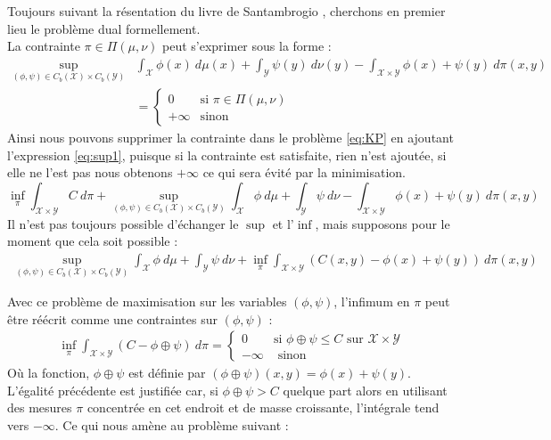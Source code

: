 \documentclass[a4paper,12pt]{article}
\begin{document}
Toujours suivant la résentation du livre de Santambrogio \cite{santambrogio2015optimal}, cherchons en premier lieu le problème dual formellement. \\
La contrainte $\pi\in\Pi(\mu,\nu)$ peut s'exprimer sous la forme : 
\begin{align}
\sup_{(\phi,\psi)\in C_b(\mathcal{X})\times C_b(\mathcal{Y})}& \int_{\mathcal{X}} \phi(x)\ d\mu (x) + \int_{\mathcal{Y}}\psi(y)\  d\nu(y) - \int_{\mathcal{X}\times\mathcal{Y}}\phi(x)+\psi(y)\ d\pi(x,y)\label{eq:sup1}\\
&= \left\{\begin{array}{cl}
0 & \text{si } \pi \in\Pi(\mu,\nu)\\
+\infty & \text{sinon}
\end{array}\right.\nonumber
\end{align}
Ainsi nous pouvons supprimer la contrainte dans le problème \eqref{eq:KP} en ajoutant l'expression \eqref{eq:sup1}, puisque si la contrainte est satisfaite, rien n'est ajoutée, si elle ne l'est pas nous obtenons $+\infty$ ce qui sera évité par la minimisation. 
$$
\inf_{\pi} \int_{\mathcal{X}\times\mathcal{Y}} C\ d\pi + \sup_{(\phi,\psi)\in C_b(\mathcal{X})\times C_b(\mathcal{Y})} \int_{\mathcal{X}} \phi\ d\mu + \int_{\mathcal{Y}}\psi\  d\nu - \int_{\mathcal{X}\times\mathcal{Y}}\phi(x)+\psi(y)\ d\pi(x,y)
$$
Il n'est pas toujours possible d'échanger le $\sup$ et l'$\inf$, mais supposons pour le moment que cela soit possible : 
\begin{align}
\sup_{(\phi,\psi)\in C_b(\mathcal{X})\times C_b(\mathcal{Y})} \int_{\mathcal{X}} \phi\ d\mu + \int_{\mathcal{Y}}\psi\  d\nu + \inf_{\pi} \int_{\mathcal{X}\times\mathcal{Y}}(C(x,y) - \phi(x)+\psi(y))\ d\pi(x,y)
\label{eq:infsupexchange}
\end{align}

Avec ce problème de maximisation sur les variables $(\phi,\psi)$, l'infimum en $\pi$ peut être réécrit comme une contraintes sur $(\phi,\psi)$ : 
\begin{align}
\inf_{\pi} \int_{\mathcal{X}\times\mathcal{Y}}(C - \phi\oplus\psi) \ d\pi = 
\left\{
\begin{array}{cl}
0 & \text{si } \phi\oplus\psi\leq C \text{ sur } \mathcal{X}\times\mathcal{Y}\\
-\infty &\text{ sinon}
\end{array}
\right.
\end{align}
Où la fonction, $\phi\oplus\psi$ est définie par $(\phi\oplus\psi)(x,y) = \phi(x)+\psi(y)$. L'égalité précédente est justifiée car, si $\phi\oplus\psi>C$ quelque part alors en utilisant des mesures $\pi$ concentrée en cet endroit et de masse croissante, l'intégrale tend vers $-\infty$. Ce qui nous amène au problème suivant : \\
\end{document}
